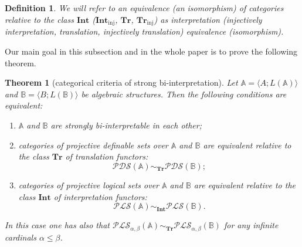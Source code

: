 \documentclass[12pt]{article}
\newtheorem{theorem}{Theorem}
\newtheorem{definition}{Definition}
\theoremstyle{definition}
\def\MA{{\mathbb{A}}}
\def\MB{{\mathbb{B}}}
\def\Int{{\mathbf{Int}}}
\def\Tr{{\mathbf{Tr}}}
\newcommand{\Inj}{\mathrm{inj}}
\def\PLS{{\mathcal{PLS}}}
\def\PDS{{\mathcal{PDS}}}
\begin{document}
\begin{definition}
We will refer to an equivalence (an isomorphism) of categories relative to the class $\Int$ ($\Int_\Inj$, $\Tr$, $\Tr_\Inj$) as {\em interpretation (injectively interpretation, translation, injectively translation) equivalence (isomorphism)}.
\end{definition}

Our main goal in this subsection and in the whole paper is to prove the following theorem.

\begin{theorem}[categorical criteria of strong bi-interpretation]\label{th:bi-inter}
Let $\MA=\langle A; L(\MA)\rangle$ and $\MB=\langle B; L(\MB)\rangle$ be algebraic structures. Then the following conditions are equivalent:
\begin{enumerate}[label=(\arabic*)]
    \item\label{item1:invert} $\MA$ and $\MB$ are strongly bi-interpretable in each other;
    \item\label{item2:invert} categories of projective definable sets over $\MA$ and $\MB$ are equivalent relative to the class $\Tr$ of translation functors:
    $$\PDS(\MA)\sim_\Tr\PDS(\MB);$$
        \item\label{item3:invert} categories of projective logical sets over $\MA$ and $\MB$ are equivalent relative to the class $\Int$ of interpretation functors:
    $$\PLS(\MA)\sim_\Int\PLS(\MB).$$
\end{enumerate}
In this case one has also that $\PLS_{\alpha,\beta}(\MA)\sim_\Tr\PLS_{\alpha,\beta}(\MB)$ for any infinite cardinals $\alpha\leqslant\beta$.
\end{theorem}
\end{document}
